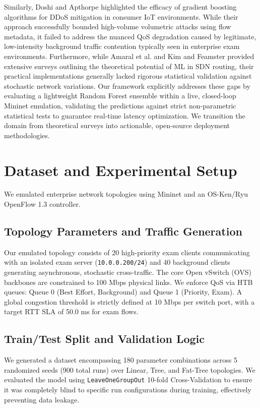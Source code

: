 \documentclass[journal]{IEEEtran}
\begin{document}
Similarly, Doshi and Apthorpe \cite{ref2} highlighted the efficacy of gradient boosting algorithms for DDoS mitigation in consumer IoT environments. While their approach successfully bounded high-volume volumetric attacks using flow metadata, it failed to address the nuanced QoS degradation caused by legitimate, low-intensity background traffic contention typically seen in enterprise exam environments. Furthermore, while Amaral et al. \cite{ref4} and Kim and Feamster \cite{ref6} provided extensive surveys outlining the theoretical potential of ML in SDN routing, their practical implementations generally lacked rigorous statistical validation against stochastic network variations. Our framework explicitly addresses these gaps by evaluating a lightweight Random Forest ensemble within a live, closed-loop Mininet emulation, validating the predictions against strict non-parametric statistical tests to guarantee real-time latency optimization. We transition the domain from theoretical surveys into actionable, open-source deployment methodologies.

\section{Dataset and Experimental Setup}
We emulated enterprise network topologies using Mininet and an OS-Ken/Ryu OpenFlow 1.3 controller.

\subsection{Topology Parameters and Traffic Generation}
Our emulated topology consists of 20 high-priority exam clients communicating with an isolated exam server (\texttt{10.0.0.200/24}) and 40 background clients generating asynchronous, stochastic cross-traffic. The core Open vSwitch (OVS) backbones are constrained to 100 Mbps physical links. We enforce QoS via HTB queues: Queue 0 (Best Effort, Background) and Queue 1 (Priority, Exam). A global congestion threshold is strictly defined at 10 Mbps per switch port, with a target RTT SLA of 50.0 ms for exam flows.

\subsection{Train/Test Split and Validation Logic}
We generated a dataset encompassing 180 parameter combinations across 5 randomized seeds (900 total runs) over Linear, Tree, and Fat-Tree topologies. We evaluated the model using \texttt{LeaveOneGroupOut} 10-fold Cross-Validation to ensure it was completely blind to specific run configurations during training, effectively preventing data leakage.
\end{document}
